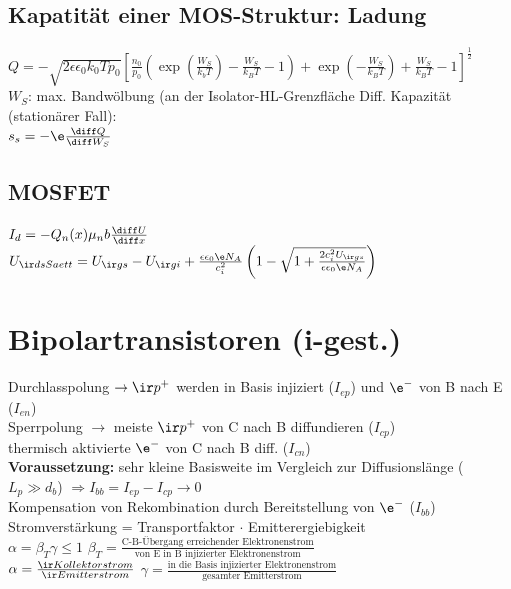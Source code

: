 \documentclass[fs, footer]{latex4ei}
\begin{document}
\begin{multicols*}{4}
\subsection{Kapatität einer MOS-Struktur: Ladung}
$Q=-\sqrt{2\epsilon\epsilon_0k_0Tp_0}\left[\frac{n_0}{p_0}\left(\exp\left(\frac{W_S}{k_bT}\right)-\frac{W_S}{k_BT}-1\right)+\exp\left(-\frac{W_S}{k_BT}\right)+\frac{W_S}{k_BT}-1\right]^\frac{1}{2}$\\
$W_S$: max. Bandwölbung (an der Isolator-HL-Grenzfläche
Diff. Kapazität (stationärer Fall):\\
$s_s = -\e\frac{\diff Q}{\diff W_S}$\\
\subsection{MOSFET}
$I_d=-Q_n(x)\mu_nb\frac{\diff U}{\diff x}$\\
$U_{\ir dsSaett} = U_{\ir gs}-U_{\ir gi}+\frac{\epsilon\epsilon_0\e N_A}{c_i^2}\left(1-\sqrt{1+\frac{2c_i^2U_{\ir gs}}{\epsilon\epsilon_0\e N_A}}\right)$\\
\section{Bipolartransistoren (i-gest.)}
Durchlasspolung $\rightarrow \ir p^+$ werden in Basis injiziert ($I_{ep}$) und $\e^-$ von B nach E ($I_{en}$)\\
Sperrpolung $\rightarrow$ meiste $\ir p^+$ von C nach B diffundieren ($I_{cp}$)\\
thermisch aktivierte $\e^-$ von C nach B diff. ($I_{cn}$)\\
\textbf{Voraussetzung:} sehr kleine Basisweite im Vergleich zur Diffusionslänge ($L_p \gg d_b$) $\Rightarrow I_{bb} = I_{ep} - I_{cp} \rightarrow 0$ \\
Kompensation von Rekombination durch Bereitstellung von $\e^-$ ($I_{bb}$)\\
Stromverstärkung = Transportfaktor $\cdot$ Emitterergiebigkeit\\
$\alpha = \beta_T\gamma \leq 1$\qquad
$\beta_T = \frac{\text{C-B-Übergang erreichender Elektronenstrom}}{\text{von E in B injizierter Elektronenstrom}}$\\
$\alpha = \frac{\ir Kollektorstrom}{\ir Emitterstrom}$\qquad
$\gamma = \frac{\text{in die Basis injizierter Elektronenstrom}}{\text{gesamter Emitterstrom}}$\\


\end{multicols*}
\end{document}
